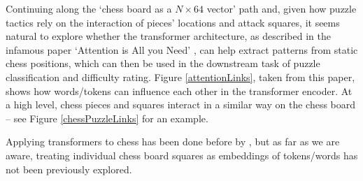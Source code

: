 Continuing along the `chess board as a $N\times64$ vector' path and, given how
puzzle tactics rely on the interaction of pieces' locations and attack squares,
it seems natural to explore whether the transformer architecture, as described
in the infamous paper `Attention is All you Need' \citep{attention}, can help
extract patterns from static chess positions, which can then be used in the
downstream task of puzzle classification and difficulty rating. Figure
\ref{attentionLinks}, taken from this paper, shows how words/tokens can
influence each other in the transformer encoder. At a high level, chess pieces
and squares interact in a similar way on the chess board -- see Figure
\ref{chessPuzzleLinks} for an example.

Applying transformers to chess has been done before by
\citet{chessTransformer}, but as far as we are aware, treating individual chess
board squares as embeddings of tokens/words has not been previously explored.

